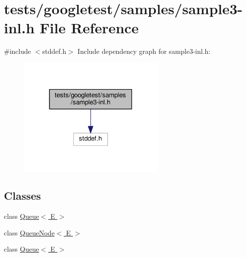 \hypertarget{sample3-inl_8h}{}\section{tests/googletest/samples/sample3-\/inl.h File Reference}
\label{sample3-inl_8h}
{\ttfamily \#include $<$stddef.\+h$>$}\newline
Include dependency graph for sample3-\/inl.h\+:\nopagebreak
\begin{figure}[H]
\begin{center}
\leavevmode
\includegraphics[width=206pt]{sample3-inl_8h__incl}
\end{center}
\end{figure}
\subsection*{Classes}
\begin{DoxyCompactItemize}
\item 
class \hyperlink{classQueue}{Queue$<$ E $>$}
\item 
class \hyperlink{classQueueNode}{Queue\+Node$<$ E $>$}
\item 
class \hyperlink{classQueue}{Queue$<$ E $>$}
\end{DoxyCompactItemize}
